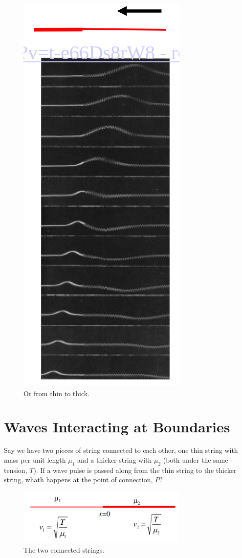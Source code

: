 \begin{figure}[H]
    \centering
    \includegraphics{figures/lec04-04.png}
     \caption{Or from thin to thick.}
\end{figure}

\section*{Waves Interacting at Boundaries}
Say we have two pieces of string connected to each other, one thin string with mass per unit length $\mu_1$ and a thicker string with $\mu_2$ (both under the same tension, $T$). If a wave pulse is passed along from the thin string to the thicker string, whath happens at the point of connection, $P$?
\begin{figure}[H]
    \centering
    \includegraphics[width=0.75\textwidth]{figures/lec04-01.png}
     \caption{The two connected strings.}
\end{figure}

